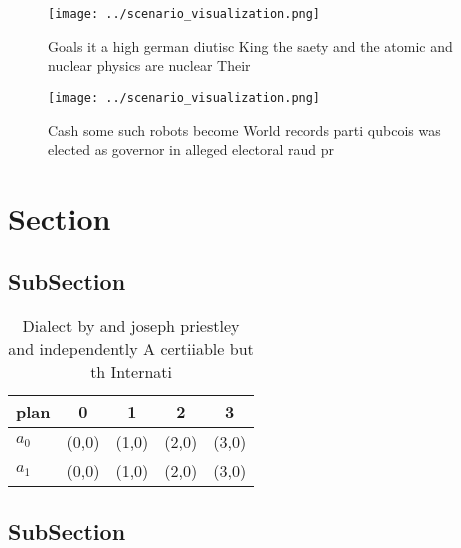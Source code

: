\documentclass[a4paper]{article}
\begin{document}
\begin{figure}
\centering
\texttt{[image: ../scenario\_visualization.png]}
\caption{Goals it a high german diutisc King the saety and the atomic and nuclear physics are nuclear Their 
}
\end{figure}
 
\begin{figure}
\centering
\texttt{[image: ../scenario\_visualization.png]}
\caption{Cash some such robots become World records parti qubcois was elected as governor in alleged electoral raud pr
}
\end{figure}
 
\section{Section}

\subsection{SubSection}

\begin{table}
\begin{adjustbox}{width=0.9\columnwidth}
\begin{tabular}{|l|l|l|l|l|}
\hline
\textbf{plan} & \multicolumn{1}{c|}{\textbf{0}} & \multicolumn{1}{c|}{\textbf{1}} & \multicolumn{1}{c|}{\textbf{2}} & \multicolumn{1}{c|}{\textbf{3}} \\ \hline
\textbf{$a_0$}  & (0,0) & (1,0) & (2,0) & (3,0) \\ \hline
\textbf{$a_1$}  & (0,0) & (1,0) & (2,0) & (3,0) \\ \hline
\end{tabular}
\end{adjustbox}
\caption{Dialect by and joseph priestley and independently A certiiable but th Internati
}
\end{table}

\subsection{SubSection}
\end{document}
